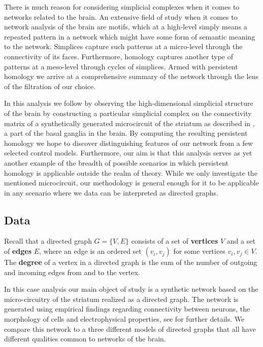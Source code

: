 There is much reason for considering simplicial complexes when it comes to networks related to the brain. An extensive field of study when it comes to network analysis of the brain are motifs, which at a high-level simply means a repeated pattern in a network which might have some form of semantic meaning to the network. Simplices capture such patterns at a micro-level through the connectivity of its faces. Furthermore, homology captures another type of patterns at a meso-level through cycles of simplices. Armed with persistent homology we arrive at a comprehensive summary of the network through the lens of the filtration of our choice.

In this analysis we follow \cite{reimann} by observing the high-dimensional simplicial structure of the brain by constructing a particular simplicial complex on the connectivity matrix of a synthetically generated microcircuit of the striatum as described in \cite{Hjorth202000671}, a part of the basal ganglia in the brain. By computing the resulting persistent homology we hope to discover distinguishing features of our network from a few selected control models. Furthermore, our aim is that this analysis serves as yet another example of the breadth of possible scenarios in which persistent homology is applicable outside the realm of theory. While we only investigate the mentioned microcircuit, our methodology is general enough for it to be applicable in any scenario where we data can be interpreted as directed graphs.

\subsection{Data}

Recall that a directed graph $G=\{V,E\}$ consists of a set of \textbf{vertices} $V$ and a set of \textbf{edges} $E$, where an edge is an ordered set $(v_{i},v_{j})$ for some vertices $v_{i},v_{j} \in V$. The \textbf{degree} of a vertex in a directed graph is the sum of the number of outgoing and incoming edges from and to the vertex.


In this case analysis our main object of study is a synthetic network based on the micro-circuitry of the striatum realized as a directed graph. The network is generated using empirical findings regarding connectivity between neurons, the morphology of cells and electrophysical properties, see \cite{Hjorth202000671} for further details. We compare this network to a three different models of directed graphs that all have different qualities common to networks of the brain.

